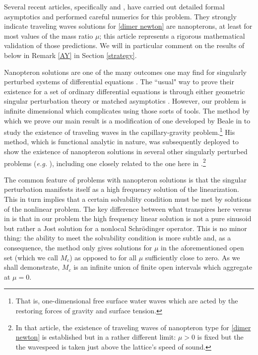 \documentclass[12pt]{amsart}
\numberwithin{equation}{section}
\begin{document}
Several recent articles, specifically \cite{VSWP} and \cite{porter}, have carried out detailed formal asymptotics and 
performed careful numerics for this problem. They strongly indicate traveling waves solutions for \eqref{dimer newton} are nanopterons, at least for most values of the mass ratio $\mu$; this article represents a
rigorous mathematical validation of those predictions.
We will in particular comment on the results of \cite{VSWP} below in Remark \ref{AY} in Section \ref{strategy}.  

Nanopteron solutions are one of the many outcomes  one may find for singularly perturbed systems of differential equations \cite{boyd}.
The ``usual" way to prove their existence for a set of ordinary differential equations is through either geometric singular perturbation theory or matched asymptotics \cite{holmes}. However, our problem is infinite dimensional which complicates using those sorts of tools.
The method by which we prove our main result is a modification of one developed by Beale in \cite{beale2} to study the existence of traveling waves in the capillary-gravity problem.\footnote{That is, one-dimensional free surface water waves which are acted
by the restoring forces of gravity and surface tension.}  His method, which is functional analytic in nature, was subsequently deployed to show the existence of nanopteron solutions in several other singularly perturbed problems ({\it e.g.} \cite{amick-toland}), including
one closely related to the one here in \cite{FW}.\footnote{In that article, the existence of traveling waves 
of nanopteron type for \eqref{dimer newton} is established but in a rather different limit: $\mu>0$ is fixed but 
the the wavespeed is taken just above the lattice's speed of sound.}

The common feature of problems with nanopteron solutions is that the singular perturbation manifests itself as a high frequency solution of the linearization.
This in turn implies that a certain solvability condition must be met by solutions of the nonlinear problem.
The key difference between what transpires here versus in \cite{beale2} \cite{amick-toland} \cite{FW} is that in our problem the high frequency linear solution is not a pure sinusoid but rather a Jost solution for a nonlocal Schr\"odinger operator. This is no minor thing: the ability to meet the solvability condition is more subtle and, as  a consequence, the method only gives solutions for $\mu$ in the aforementioned open set (which we call $M_c$)
as opposed to for all $\mu$ sufficiently close to zero.
As we shall demonstrate, $M_c$ is an infinite union of finite open intervals which aggregate at $\mu = 0$. 
\end{document}
